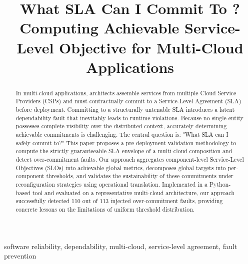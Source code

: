 \documentclass[conference]{IEEEtran}
\begin{document}
\title{What SLA Can I Commit To ? Computing Achievable Service-Level Objective for Multi-Cloud Applications}

\author{
\and
{}
}

\maketitle

\begin{abstract}
In multi-cloud applications, architects assemble services from multiple Cloud Service Providers (CSPs) and must contractually commit to a Service-Level Agreement (SLA) before deployment. Committing to a structurally untenable SLA introduces a latent dependability fault that inevitably leads to runtime violations. Because no single entity possesses complete visibility over the distributed context, accurately determining achievable commitments is challenging. The central question is: "What SLA can I safely commit to?" This paper proposes a pre-deployment validation methodology to compute the strictly guaranteeable SLA envelope of a multi-cloud composition and detect over-commitment faults. Our approach aggregates component-level Service-Level Objectives (SLOs) into achievable global metrics, decomposes global targets into per-component thresholds, and validates the sustainability of these commitments under reconfiguration strategies using operational translation. Implemented in a Python-based tool and evaluated on a representative multi-cloud architecture, our approach successfully detected 110 out of 113 injected over-commitment faults, providing concrete lessons on the limitations of uniform threshold distribution.
\end{abstract}

\begin{IEEEkeywords}
software reliability, dependability, multi-cloud, service-level agreement,
fault prevention
\end{IEEEkeywords}
\end{document}
